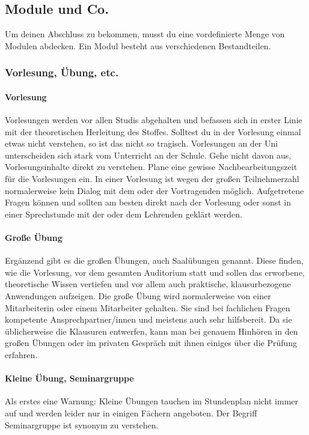 
\subsection{Module und Co.}
	Um deinen Abschluss zu bekommen, musst du eine vordefinierte Menge von Modulen abdecken. Ein Modul besteht aus verschiedenen Bestandteilen.

\subsubsection{Vorlesung, Übung, etc.}
	\paragraph*{Vorlesung}
	Vorlesungen werden vor allen Studis abgehalten und befassen sich in erster Linie mit der theoretischen Herleitung des Stoffes. Solltest du in der Vorlesung einmal etwas nicht verstehen, so ist das nicht so tragisch. Vorlesungen an der Uni unterscheiden sich stark vom Unterricht an der Schule. Gehe nicht davon aus, Vorlesungsinhalte direkt zu verstehen. Plane eine gewisse Nachbearbeitungszeit für die Vorlesungen ein. In einer Vorlesung ist wegen der großen Teilnehmerzahl normalerweise kein Dialog mit dem oder der Vortragenden möglich. Aufgetretene Fragen können und sollten am besten direkt nach der Vorlesung oder sonst in einer Sprechstunde mit der oder dem Lehrenden geklärt werden.
	
	\paragraph*{Große Übung}
	Ergänzend gibt es die großen Übungen, auch Saalübungen genannt. Diese finden, wie die Vorlesung, vor dem gesamten Auditorium statt und sollen das erworbene, theoretische Wissen vertiefen und vor allem auch praktische, klausurbezogene Anwendungen aufzeigen. Die große Übung wird normalerweise von einer Mitarbeiterin oder einem Mitarbeiter gehalten. Sie sind bei  fachlichen Fragen kompetente Ansprechpartner/innen und meistens auch sehr hilfsbereit. Da sie  üblicherweise die Klausuren entwerfen, kann man bei genauem Hinhören in den großen Übungen oder im privaten Gespräch mit ihnen einiges über die Prüfung erfahren.

	\paragraph*{Kleine Übung, Seminargruppe}
	Als erstes eine Warnung: Kleine Übungen tauchen im Stundenplan nicht immer auf und werden leider nur in einigen Fächern angeboten. Der Begriff Seminargruppe ist synonym zu verstehen.
	
